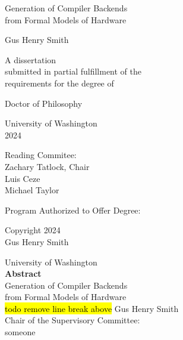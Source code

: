 \documentclass[12pt, hidelinks]{book}
\title{\mytitle}
\author{\myauthor}
\def\mytitle{Generation of Compiler Backends\\ from Formal Models of Hardware}
\def\myauthor{Gus Henry Smith}
\def\year{2024}
\begin{document}

\pagestyle{empty}

\begin{center}
  {\huge \mytitle}
  \vfill

  {\Large \myauthor}
  \vfill

  \begin{spacing}{1}
    A dissertation \\
    submitted in partial fulfillment of the \\
    requirements for the degree of
  \end{spacing}
  \vfill

  Doctor of Philosophy
  \vfill

  University of Washington \\
  \year
  \vfill

  Reading Commitee: \\
  Zachary Tatlock, Chair \\
  Luis Ceze \\
  Michael Taylor
  \vfill

  \begin{spacing}{1}
    Program Authorized to Offer Degree: \\
    \cse
  \end{spacing}
  \clearpage

  \textcopyright{} Copyright \year\\
  \myauthor
  \clearpage
\end{center}

\pagestyle{plain}
\setcounter{page}{1}

\begin{center}
  University of Washington \\[1em]
  \textbf{Abstract}        \\[1em]
  \mytitle                 \\[1em]
  \hl{todo remove line break above}
  \myauthor                \\[1em]

  Chair of the Supervisory Committee: \\[-0.5em]
  someone \\[-0.5em]
  \pgas
  \\[2em]
\end{center}

\end{document}
